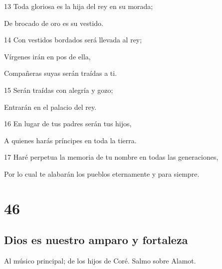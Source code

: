 \par 13 Toda gloriosa es la hija del rey en su morada;
\par De brocado de oro es su vestido.
\par 14 Con vestidos bordados será llevada al rey;
\par Vírgenes irán en pos de ella,
\par Compañeras suyas serán traídas a ti.
\par 15 Serán traídas con alegría y gozo;
\par Entrarán en el palacio del rey.
\par 16 En lugar de tus padres serán tus hijos,
\par A quienes harás príncipes en toda la tierra.
\par 17 Haré perpetua la memoria de tu nombre en todas las generaciones,
\par Por lo cual te alabarán los pueblos eternamente y para siempre.

\chapter{46}

\section*{Dios es nuestro amparo y fortaleza}

\par Al músico principal; de los hijos de Coré. Salmo sobre Alamot.

